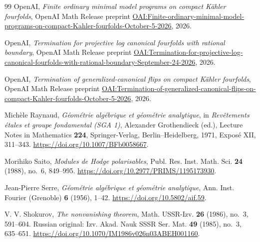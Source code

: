 \documentclass[11pt]{amsart}
\theoremstyle{definition}
\theoremstyle{remark}
\numberwithin{equation}{section}
\begin{document}
\begin{thebibliography}{99}
OpenAI,
\emph{Finite ordinary minimal model programs on compact K\"ahler fourfolds},
OpenAI Math Release preprint
\href{https://github.com/openai/math/blob/main/preprints/Finite-ordinary-minimal-model-programs-on-compact-Kahler-fourfolds-October-5-2026/paper.pdf}{OAI:Finite-ordinary-minimal-model-programs-on-compact-Kahler-fourfolds-October-5-2026},
2026.

OpenAI,
\emph{Termination for projective log canonical fourfolds with rational boundary},
OpenAI Math Release preprint
\href{https://github.com/openai/math/blob/main/preprints/Termination-for-projective-log-canonical-fourfolds-with-rational-boundary-September-24-2026/paper.pdf}{OAI:Termination-for-projective-log-canonical-fourfolds-with-rational-boundary-September-24-2026},
2026.

OpenAI,
\emph{Termination of generalized-canonical flips on compact K\"ahler fourfolds},
OpenAI Math Release preprint
\href{https://github.com/openai/math/blob/main/preprints/Termination-of-generalized-canonical-flips-on-compact-Kahler-fourfolds-October-5-2026/termination-generalized-terminal-flips-compact-kahler-fourfolds.pdf}{OAI:Termination-of-generalized-canonical-flips-on-compact-Kahler-fourfolds-October-5-2026},
2026.

Mich\`ele Raynaud,
\emph{G\'eom\'etrie alg\'ebrique et g\'eom\'etrie analytique},
in \emph{Rev\^etements \'etales et groupe fondamental (SGA 1)},
Alexander Grothendieck (ed.), Lecture Notes in Mathematics \textbf{224},
Springer-Verlag, Berlin--Heidelberg, 1971, Expos\'e XII, 311--343.
\url{https://doi.org/10.1007/BFb0058667}.

Morihiko Saito,
\emph{Modules de Hodge polarisables},
Publ. Res. Inst. Math. Sci. \textbf{24} (1988), no.~6, 849--995.
\url{https://doi.org/10.2977/PRIMS/1195173930}.

Jean-Pierre Serre,
\emph{G\'eom\'etrie alg\'ebrique et g\'eom\'etrie analytique},
Ann. Inst. Fourier (Grenoble) \textbf{6} (1956), 1--42.
\url{https://doi.org/10.5802/aif.59}.

V. V. Shokurov,
\emph{The nonvanishing theorem},
Math. USSR-Izv. \textbf{26} (1986), no.~3, 591--604.
Russian original: Izv. Akad. Nauk SSSR Ser. Mat. \textbf{49} (1985),
no.~3, 635--651.
\url{https://doi.org/10.1070/IM1986v026n03ABEH001160}.

\end{thebibliography}
\end{document}
